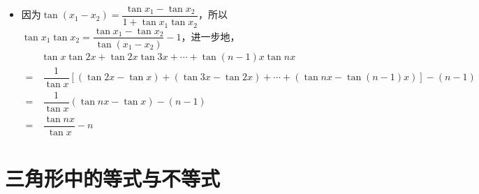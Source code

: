 \begin{itemize}[leftmargin=\inteval{\myitemleftmargin}pt,itemsep=
   \inteval{\myitemitempsep}pt,topsep=\inteval{\myitemtopsep}pt]
\item 因为$ \tan(x_1-x_2)=\dfrac{\tan x_1-\tan x_2}{
    1+\tan x_1 \tan x_2} $，所以$ \tan x_1 \tan x_2=\dfrac{
    \tan x_1-\tan x_2}{\tan(x_1-x_2)}-1 $，进一步地，
\begin{align*}
    & \tan x\tan 2x+\tan 2x\tan 3x+\cdots +
    \tan (n-1)x\tan nx \\
    =&\ \dfrac{1}{\tan x}\left[(\tan 2x-\tan x)+
    (\tan 3x-\tan 2x)+\cdots +(\tan nx-\tan (n-1)x)\right]
    -(n-1)	\\ =&\  \dfrac{1}{\tan x}\left( \tan nx-
    \tan x\right)-(n-1) \\ =&\  \dfrac{\tan nx}{\tan x}-n
\end{align*}

\end{itemize}

\section{三角形中的等式与不等式}
